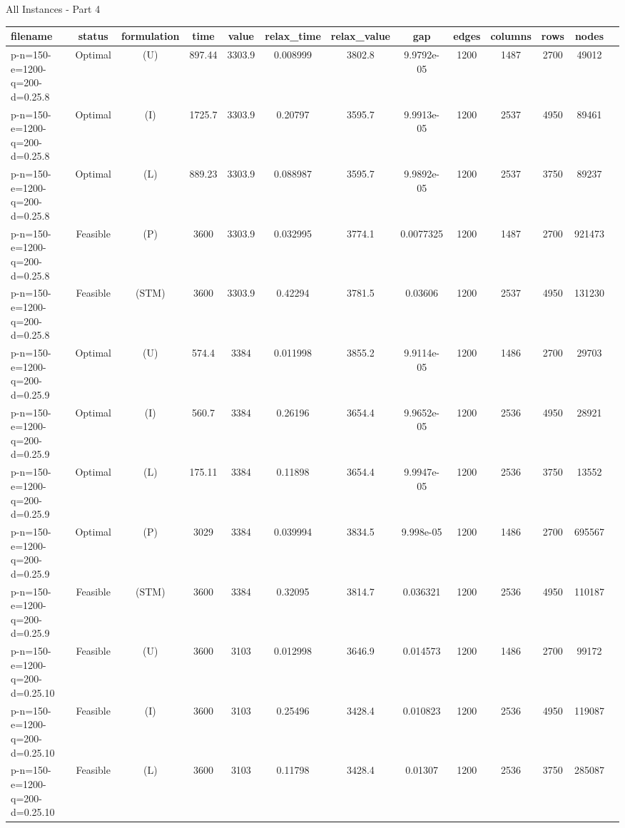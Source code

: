 \documentclass[landscape, a4paper]{article}
\newcommand{\STM}{\ensuremath{\mathrm{STM}}}
\newcommand{\Improved}{\ensuremath{\mathrm{I}}}
\newcommand{\Loose}{\ensuremath{\mathrm{L}}}
\newcommand{\Profit}{\ensuremath{\mathrm{P}}}
\newcommand{\Utility}{\ensuremath{\mathrm{U}}}
\begin{document}
\begin{center}
\newpage
All Instances - Part 4

\begin{tabular}{lcccccccccccc}
filename & status & formulation & time & value & relax\_time & relax\_value & gap & edges & columns & rows & nodes & \\
\hline
p-n=150-e=1200-q=200-d=0.25.8 & Optimal & (\Utility) & 897.44 & 3303.9 & 0.008999 & 3802.8 & 9.9792e-05 & 1200 & 1487 & 2700 & 49012 & \\
p-n=150-e=1200-q=200-d=0.25.8 & Optimal & (\Improved) & 1725.7 & 3303.9 & 0.20797 & 3595.7 & 9.9913e-05 & 1200 & 2537 & 4950 & 89461 & \\
p-n=150-e=1200-q=200-d=0.25.8 & Optimal & (\Loose) & 889.23 & 3303.9 & 0.088987 & 3595.7 & 9.9892e-05 & 1200 & 2537 & 3750 & 89237 & \\
p-n=150-e=1200-q=200-d=0.25.8 & Feasible & (\Profit) & 3600 & 3303.9 & 0.032995 & 3774.1 & 0.0077325 & 1200 & 1487 & 2700 & 921473 & \\
p-n=150-e=1200-q=200-d=0.25.8 & Feasible & (\STM) & 3600 & 3303.9 & 0.42294 & 3781.5 & 0.03606 & 1200 & 2537 & 4950 & 131230 & \\
p-n=150-e=1200-q=200-d=0.25.9 & Optimal & (\Utility) & 574.4 & 3384 & 0.011998 & 3855.2 & 9.9114e-05 & 1200 & 1486 & 2700 & 29703 & \\
p-n=150-e=1200-q=200-d=0.25.9 & Optimal & (\Improved) & 560.7 & 3384 & 0.26196 & 3654.4 & 9.9652e-05 & 1200 & 2536 & 4950 & 28921 & \\
p-n=150-e=1200-q=200-d=0.25.9 & Optimal & (\Loose) & 175.11 & 3384 & 0.11898 & 3654.4 & 9.9947e-05 & 1200 & 2536 & 3750 & 13552 & \\
p-n=150-e=1200-q=200-d=0.25.9 & Optimal & (\Profit) & 3029 & 3384 & 0.039994 & 3834.5 & 9.998e-05 & 1200 & 1486 & 2700 & 695567 & \\
p-n=150-e=1200-q=200-d=0.25.9 & Feasible & (\STM) & 3600 & 3384 & 0.32095 & 3814.7 & 0.036321 & 1200 & 2536 & 4950 & 110187 & \\
p-n=150-e=1200-q=200-d=0.25.10 & Feasible & (\Utility) & 3600 & 3103 & 0.012998 & 3646.9 & 0.014573 & 1200 & 1486 & 2700 & 99172 & \\
p-n=150-e=1200-q=200-d=0.25.10 & Feasible & (\Improved) & 3600 & 3103 & 0.25496 & 3428.4 & 0.010823 & 1200 & 2536 & 4950 & 119087 & \\
p-n=150-e=1200-q=200-d=0.25.10 & Feasible & (\Loose) & 3600 & 3103 & 0.11798 & 3428.4 & 0.01307 & 1200 & 2536 & 3750 & 285087 & \\

\end{tabular}
\end{center}
\end{document}

